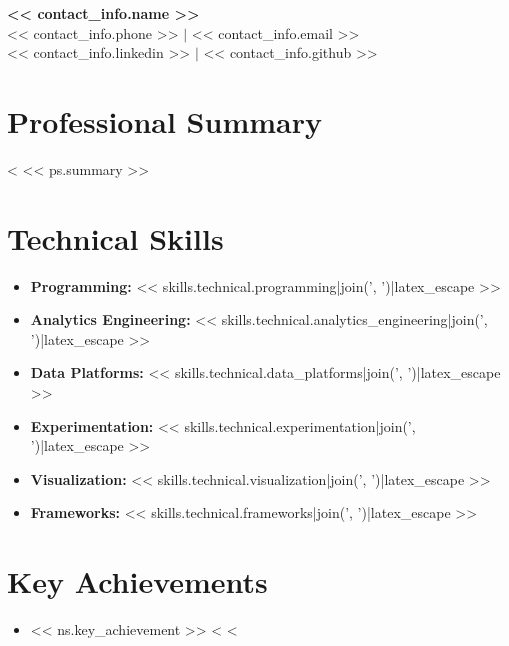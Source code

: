 \documentclass[letterpaper,11pt]{article}
\newcommand{\sectionheader}[1]{\section*{#1}}
\begin{document}
\begin{center}
    {\LARGE \textbf{<< contact_info.name >>}} \\
    \vspace{2pt}
    << contact_info.phone >> $|$ << contact_info.email >> \\
    << contact_info.linkedin >> $|$ << contact_info.github >>
\end{center}

\vspace{10pt}

\sectionheader{Professional Summary}
<%
<< ps.summary >>

\vspace{10pt}

\sectionheader{Technical Skills}
\begin{itemize}[leftmargin=*]
    \item \textbf{Programming:} << skills.technical.programming|join(', ')|latex_escape >>
    \item \textbf{Analytics Engineering:} << skills.technical.analytics_engineering|join(', ')|latex_escape >>
    \item \textbf{Data Platforms:} << skills.technical.data_platforms|join(', ')|latex_escape >>
    \item \textbf{Experimentation:} << skills.technical.experimentation|join(', ')|latex_escape >>
    \item \textbf{Visualization:} << skills.technical.visualization|join(', ')|latex_escape >>
    \item \textbf{Frameworks:} << skills.technical.frameworks|join(', ')|latex_escape >>
\end{itemize}

\vspace{10pt}

\sectionheader{Key Achievements}
\begin{itemize}[leftmargin=*]
<%
  <%
    <%
    \item << ns.key_achievement >>
  <%
<%
\end{itemize}

\vspace{10pt}
\end{document}
